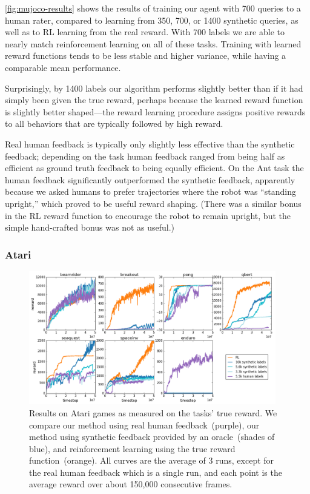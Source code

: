 \documentclass{article}
\def\plotsize{0.96}  %
\begin{document}
\autoref{fig:mujoco-results} shows the results of training our agent with 700 queries to a human rater,
compared to learning from 350, 700, or 1400 synthetic queries,
as well as to RL learning from the real reward.
With 700 labels we are able to nearly match reinforcement learning on all of these tasks.
Training with learned reward functions tends to be less stable and higher variance,
while having a comparable mean performance.

Surprisingly, by 1400 labels our algorithm performs slightly better than if it had simply been given the true reward,
perhaps because the learned reward function is slightly better shaped---the reward learning procedure assigns positive rewards
to all behaviors that are typically followed by high reward.

Real human feedback is typically only slightly less effective than the synthetic feedback;
depending on the task human feedback ranged from being half as efficient as ground truth
feedback to being equally efficient.
On the Ant task the human feedback significantly outperformed the synthetic feedback, apparently because we asked humans to prefer trajectories where the robot was ``standing upright,'' which proved to be
useful reward shaping. (There was a similar bonus in the RL reward function to encourage the robot to remain upright,
but the simple hand-crafted bonus was not as useful.)

\subsubsection{Atari}

\begin{figure}
\begin{center}
\includegraphics[width=\plotsize\textwidth]{main_atari_figure.png}
\end{center}
\caption{%
Results on Atari games as measured on the tasks' true reward.
We compare our method using real human feedback~(purple),
our method using synthetic feedback provided by an oracle~(shades of blue),
and reinforcement learning using the true reward function~(orange).
All curves are the average of 3 runs, except for
the real human feedback which is a single run, and
each point is the average reward over about 150,000 consecutive frames.
}
\label{fig:Atari-results}
\end{figure}
\end{document}
